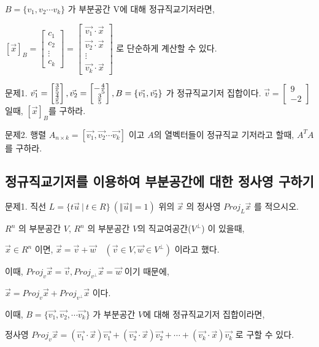 \begin{lemma}   
$B = \{ v_1, v_2 \cdots v_k \}$ 가 부분공간 V에 대해 정규직교기저라면,

$[\vec{x}]_B = \begin{bmatrix} c_1 \\ c_2 \\ \vdots \\ c_k\end{bmatrix} = \begin{bmatrix} \vec{v_1}\cdot\vec{x} \\ \vec{v_2}\cdot\vec{x} \\ \vdots \\ \vec{v_k}\cdot\vec{x}\end{bmatrix}$  로 단순하게 계산할 수 있다.
\end{lemma}



\newpage
문제1. $\vec{v_1} = \begin{bmatrix} {3 \over 5} \\ {4 \over 5} \end{bmatrix}, \vec{v_2} = \begin{bmatrix} -{4 \over 5} \\ {3 \over 5} \end{bmatrix}, B = \{ \vec{v_1}, \vec{v_2} \}$ 가 정규직교기저 집합이다. $\vec{v} = \begin{bmatrix} 9 \\ -2 \end{bmatrix}$ 일때, $[\vec{x}]_B$를 구하라.

문제2. 행렬 $A_{n \times k} = [ \vec{v_1}, \vec{v_2} \cdots \vec{v_k} ]$ 이고 $A$의 열벡터들이 정규직교 기저라고 할때, $A^{T}A$ 를 구하라.
\newpage
\subsection{정규직교기저를 이용하여 부분공간에 대한 정사영 구하기}
\newpage
문제1. 직선 $L = \{ t\vec{u} \ \vert \ t \in R \} \ (\Vert \vec{u} \Vert = 1)$ 위의 $\vec{x}$ 의 정사영 $Proj_L\vec{x}$ 를 적으시오.

\begin{theorem}
$R^n$ 의 부분공간 $V$, $R^n$ 의 부분공간 $V$의 직교여공간($V^\perp$) 이 있을때,

$\vec{x} \in R^n$ 이면, $\vec{x} = \vec{v} + \vec{w} \quad (\vec{v} \in V, \vec{w} \in V^{\perp})$ 이라고 했다.

이때, $Proj_v\vec{x} = \vec{v}, Proj_{v^{\perp}}\vec{x} = \vec{w}$ 이기 때문에,

$\vec{x} = Proj_v\vec{x} + Proj_{v^{\perp}}\vec{x}$ 이다.

이때, $B = \{ \vec{v_1},\vec{v_2}, \cdots \vec{v_k} \}$ 가 부분공간 $V$에 대해 정규직교기저 집합이라면,

정사영 $Proj_v\vec{x} = (\vec{v_1}\cdot\vec{x})\vec{v_1} + (\vec{v_2}\cdot\vec{x})\vec{v_2} + \cdots + (\vec{v_k}\cdot\vec{x})\vec{v_k}$ 로 구할 수 있다.
\end{theorem}

